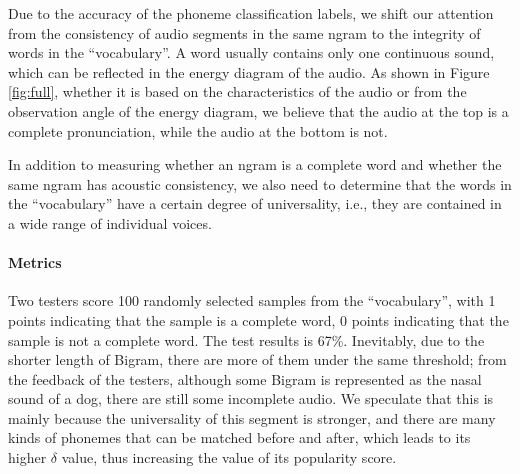 Due to the accuracy of the phoneme classification labels, we shift our attention from the consistency of audio segments in the same ngram to the integrity of words in the ``vocabulary''. A word usually contains only one continuous sound, which can be reflected in the energy diagram of the audio. As shown in Figure \ref{fig:full}, whether it is based on the characteristics of the audio or from the observation angle of the energy diagram, we believe that the audio at the top is a complete pronunciation, while the audio at the bottom is not. 

In addition to measuring whether an ngram is a complete word and whether the same ngram has acoustic consistency, we also need to determine that the words in the ``vocabulary'' have a certain degree of universality, i.e., they are contained in a wide range of individual voices. 


\paragraph{Metrics}

Two testers score 100 randomly selected samples from the ``vocabulary'', with 1 points indicating that the sample is a complete word, 0 points indicating that the sample is not a complete word. The test results is 67\%. Inevitably, due to the shorter length of Bigram, there are more of them under the same threshold; from the feedback of the testers, although some Bigram is represented as the nasal sound of a dog, there are still some incomplete audio. We speculate that this is mainly because the universality of this segment is stronger, and there are many kinds of phonemes that can be matched before and after, which leads to its higher $\delta$ value, thus increasing the value of its popularity score.%

